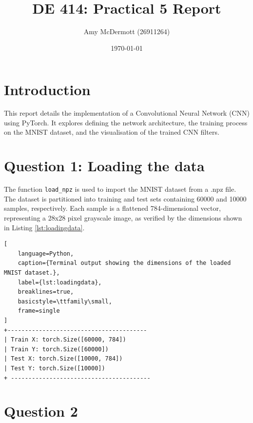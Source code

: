 \documentclass[11pt]{article}
\title{DE 414: Practical 5 Report}
\author{Amy McDermott (26911264)}
\date{\today}
\begin{document}
\maketitle

\section*{Introduction}
This report details the implementation of a Convolutional Neural Network (CNN) using PyTorch. It explores defining the network architecture, the training process on the MNIST dataset, 
and the visualisation of the trained CNN filters.

\section*{Question 1: Loading the data}
The function \texttt{load\_npz} is used to import the MNIST dataset from a .npz file. The dataset is partitioned into training and test sets containing 60000 and 10000 samples, respectively.
Each sample is a flattened 784-dimensional vector, representing a 28x28 pixel grayscale image, as verified by the dimensions shown in Listing \ref{lst:loadingdata}.
\begin{lstlisting}[
    language=Python, 
    caption={Terminal output showing the dimensions of the loaded MNIST dataset.},
    label={lst:loadingdata},
    breaklines=true,
    basicstyle=\ttfamily\small,
    frame=single
]
+----------------------------------------
| Train X: torch.Size([60000, 784])
| Train Y: torch.Size([60000])
| Test X: torch.Size([10000, 784])
| Test Y: torch.Size([10000])
+ ----------------------------------------
\end{lstlisting}

\section*{Question 2}
\end{document}
